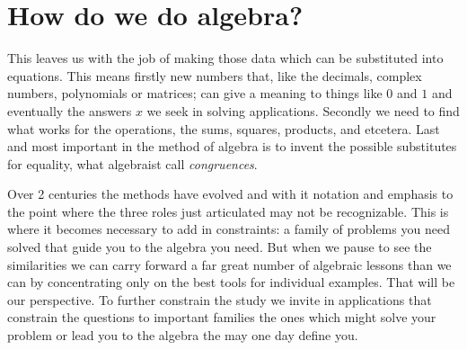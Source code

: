 \chapter{How do we do algebra?}

This leaves us with the job of making those data which can be substituted 
into equations.  This means firstly new numbers that, like the decimals, complex 
numbers, polynomials or matrices; can give a meaning to things like $0$ and $1$
and eventually the answers $x$ we seek in solving applications.  Secondly 
we need to find what works for the operations, the sums, squares, products, and 
etcetera.  Last and most important in the method of algebra is to invent the possible 
substitutes for equality, what algebraist call \emph{congruences}.  

Over 2 centuries the methods have evolved and with it notation and emphasis to
the point where the three roles just articulated may not be recognizable.  
This is where it becomes necessary to add in constraints: a family of problems 
you need solved that guide you to the algebra you need.  But when we pause to see 
the similarities we can carry forward a far great number of algebraic lessons 
than we can by concentrating only on the best tools for individual examples.
That will be our perspective.  To further constrain the study we invite in 
applications that constrain the questions to important families the ones
which might solve your problem or lead you to the algebra the may one day define you.

